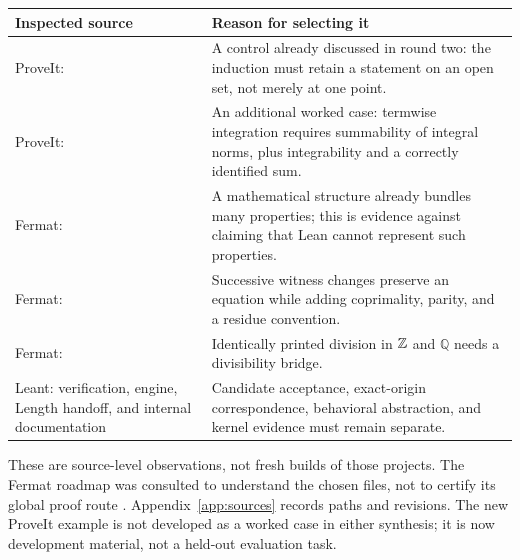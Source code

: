 \documentclass[11pt,a4paper]{article}
\newcommand{\Q}{\mathbb Q}\newcommand{\R}{\mathbb R}
\theoremstyle{plain}\newtheorem{proposition}{Proposition}[section]
\theoremstyle{definition}\newtheorem{definition}[proposition]{Definition}
\theoremstyle{remark}\newtheorem{remark}[proposition]{Remark}
\begin{document}
\begin{center}\small
\begin{tabularx}{\textwidth}{@{}P{.25\textwidth}Y@{}}
\toprule
Inspected source & Reason for selecting it\\
\midrule
ProveIt:  & A control already discussed in round two: the induction must retain a statement on an open set, not merely at one point.\\
ProveIt:  & An additional worked case: termwise integration requires summability of integral norms, plus integrability and a correctly identified sum.\\
Fermat:  & A mathematical structure already bundles many properties; this is evidence against claiming that Lean cannot represent such properties.\\
Fermat:  & Successive witness changes preserve an equation while adding coprimality, parity, and a residue convention.\\
Fermat:  & Identically printed division in \(\mathbb Z\) and \(\Q\) needs a divisibility bridge.\\
Leant: verification, engine, Length handoff, and internal documentation & Candidate acceptance, exact-origin correspondence, behavioral abstraction, and kernel evidence must remain separate.\\
\bottomrule
\end{tabularx}
\end{center}

These are source-level observations, not fresh builds of those projects. The Fermat roadmap was consulted to understand the chosen files, not to certify its global proof route \cite{fltpath}. Appendix~\ref{app:sources} records paths and revisions. The new ProveIt example is not developed as a worked case in either synthesis; it is now development material, not a held-out evaluation task.
\end{document}
